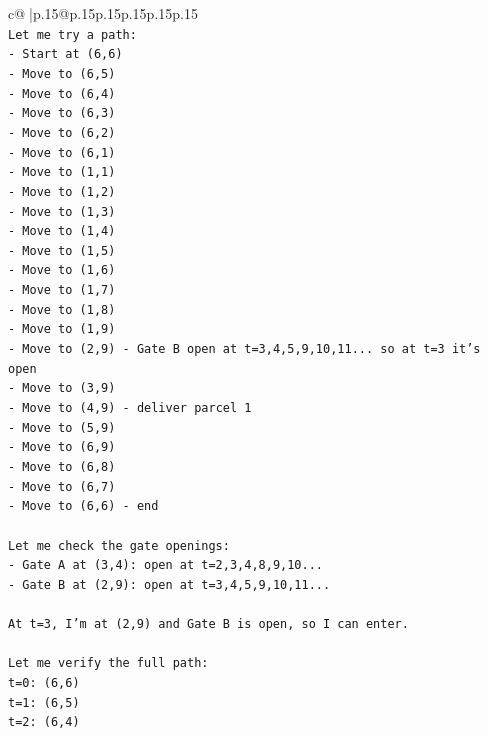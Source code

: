 \documentclass{article}
\begin{document}
{\begin{supertabular}{c@{$\;$}|p{.15\linewidth}@{}p{.15\linewidth}p{.15\linewidth}p{.15\linewidth}p{.15\linewidth}p{.15\linewidth}}
{{{\\ 
\texttt{Let me try a path:} \\
\texttt{{-} Start at (6,6)} \\
\texttt{{-} Move to (6,5)} \\
\texttt{{-} Move to (6,4)} \\
\texttt{{-} Move to (6,3)} \\
\texttt{{-} Move to (6,2)} \\
\texttt{{-} Move to (6,1)} \\
\texttt{{-} Move to (1,1)} \\
\texttt{{-} Move to (1,2)} \\
\texttt{{-} Move to (1,3)} \\
\texttt{{-} Move to (1,4)} \\
\texttt{{-} Move to (1,5)} \\
\texttt{{-} Move to (1,6)} \\
\texttt{{-} Move to (1,7)} \\
\texttt{{-} Move to (1,8)} \\
\texttt{{-} Move to (1,9)} \\
\texttt{{-} Move to (2,9) {-} Gate B open at t=3,4,5,9,10,11... so at t=3 it's open} \\
\texttt{{-} Move to (3,9)} \\
\texttt{{-} Move to (4,9) {-} deliver parcel 1} \\
\texttt{{-} Move to (5,9)} \\
\texttt{{-} Move to (6,9)} \\
\texttt{{-} Move to (6,8)} \\
\texttt{{-} Move to (6,7)} \\
\texttt{{-} Move to (6,6) {-} end} \\
\\ 
\texttt{Let me check the gate openings:} \\
\texttt{{-} Gate A at (3,4): open at t=2,3,4,8,9,10...} \\
\texttt{{-} Gate B at (2,9): open at t=3,4,5,9,10,11...} \\
\\ 
\texttt{At t=3, I'm at (2,9) and Gate B is open, so I can enter.} \\
\\ 
\texttt{Let me verify the full path:} \\
\texttt{t=0: (6,6)} \\
\texttt{t=1: (6,5)} \\
\texttt{t=2: (6,4)} \\
}}}
\end{supertabular}}
\end{document}
